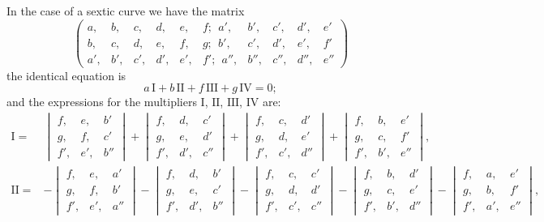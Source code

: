 \documentclass[11pt]{article}
\begin{document}
In the case of a sextic curve we have the matrix
\[
\begin{pmatrix}
a, & b, & c, & d, & e, & f;\ \  a', & b', & c', & d', & e'\\
b, & c, & d, & e, & f, & g;\ \  b', & c', & d', & e', & f'\\
a', & b', & c', & d', & e', & f';\ \ a'', & b'', & c'', & d'', & e''
\end{pmatrix}
\]
the identical equation is
\[
a\,\mathrm{I} + b\,\mathrm{II} + f\,\mathrm{III} + g\,\mathrm{IV} = 0;
\]
and the expressions for the multipliers $\mathrm{I}$, $\mathrm{II}$, $\mathrm{III}$, $\mathrm{IV}$ are:
\[
\begin{aligned}
\mathrm{I} = & \begin{vmatrix} f, & e, & b'\\ g, & f, & c'\\ f', & e', & b'' \end{vmatrix} + \begin{vmatrix} f, & d, & c'\\ g, & e, & d'\\ f', & d', & c'' \end{vmatrix} + \begin{vmatrix} f, & c, & d'\\ g, & d, & e'\\ f', & c', & d'' \end{vmatrix} + \begin{vmatrix} f, & b, & e'\\ g, & c, & f'\\ f', & b', & e'' \end{vmatrix},\\[6pt]
\mathrm{II} = & -\begin{vmatrix} f, & e, & a'\\ g, & f, & b'\\ f', & e', & a'' \end{vmatrix} - \begin{vmatrix} f, & d, & b'\\ g, & e, & c'\\ f', & d', & b'' \end{vmatrix} - \begin{vmatrix} f, & c, & c'\\ g, & d, & d'\\ f', & c', & c'' \end{vmatrix} - \begin{vmatrix} f, & b, & d'\\ g, & c, & e'\\ f', & b', & d'' \end{vmatrix} - \begin{vmatrix} f, & a, & e'\\ g, & b, & f'\\ f', & a', & e'' \end{vmatrix},\\[6pt]

\end{aligned}\]
\end{document}
